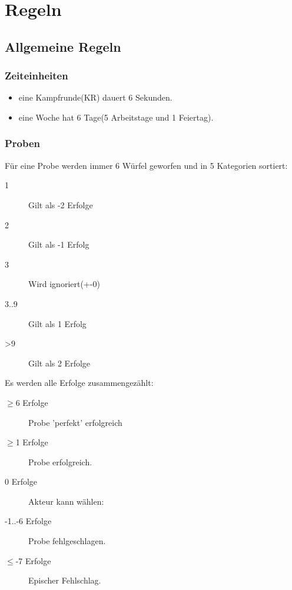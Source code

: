 \raggedright
\part{Regeln}
\chapter{Allgemeine Regeln}
\section{Zeiteinheiten}
\begin{itemize}
\item eine Kampfrunde(KR) dauert 6 Sekunden.
\item eine Woche hat 6 Tage(5 Arbeitstage und 1 Feiertag).
\end{itemize}

\section{Proben}
\label{AllgProben}

Für eine Probe werden immer 6 Würfel geworfen und in 5 Kategorien sortiert:
\begin{description}
\item[1] Gilt als -2 Erfolge
\item[2] Gilt als -1 Erfolg
\item[3] Wird ignoriert(+-0)
\item[3..9] Gilt als 1 Erfolg
\item[>9] Gilt als 2 Erfolge
\end{description}
Es werden alle Erfolge zusammengezählt:
\begin{description}
\item[$\geq$6 Erfolge] Probe 'perfekt' erfolgreich
\item[$\geq$1 Erfolge] Probe erfolgreich.
\item[0 Erfolge] Akteur kann wählen:
\item[-1..-6 Erfolge] Probe fehlgeschlagen.
\item[$\leq$-7 Erfolge] Epischer Fehlschlag.
\end{description}

